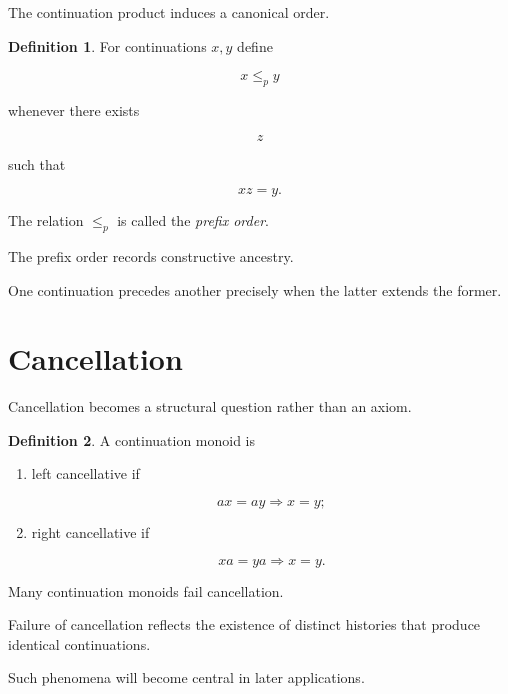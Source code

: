 \documentclass[13pt,openany]{book}
\theoremstyle{plain}
\theoremstyle{definition}
\newtheorem{definition}{Definition}[chapter]
\begin{document}
The continuation product induces a canonical order.

\begin{definition}

For continuations $x,y$ define

\[
x\leq_p y
\]

whenever there exists

\[
z
\]

such that

\[
xz=y.
\]

The relation $\leq_p$ is called the \emph{prefix order}.

\end{definition}

The prefix order records constructive ancestry.

One continuation precedes another precisely when the latter extends the former.

\section{Cancellation}

Cancellation becomes a structural question rather than an axiom.

\begin{definition}

A continuation monoid is

\begin{enumerate}
\item left cancellative if

\[
ax=ay
\Longrightarrow
x=y;
\]

\item right cancellative if

\[
xa=ya
\Longrightarrow
x=y.
\]

\end{enumerate}

\end{definition}

Many continuation monoids fail cancellation.

Failure of cancellation reflects the existence of distinct histories that
produce identical continuations.

Such phenomena will become central in later applications.

\end{document}
